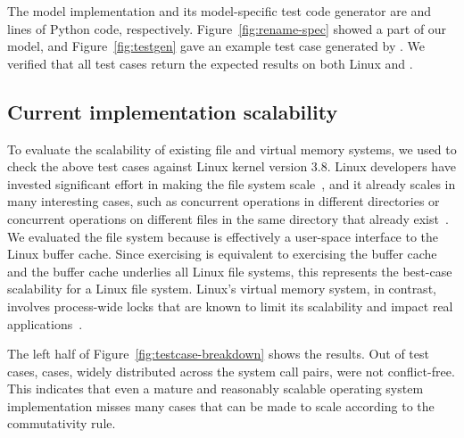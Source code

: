 The model implementation and its model-specific test code generator
are  and
 lines of Python code,
respectively.
Figure~\ref{fig:rename-spec} showed a part of our
model, and Figure~\ref{fig:testgen} gave an example test
case generated by \tool{}.  We verified that all test cases return
the expected results on both Linux and \sys.
\cbend

\begin{figure*}
\small
\centering

\caption{
  Scalability for system call pairs, showing the fraction and number
  of test cases generated by \tool that are not
  conflict-free for each system call pair.
  One example test case was shown in Figure~\ref{fig:testgen}.
}
\label{fig:testcase-breakdown}
\end{figure*}


\subsection{Current implementation scalability}

To evaluate the scalability of existing file and virtual memory systems,
we used \mtrace{} to check the above test cases against
Linux kernel version 3.8.
Linux developers have invested significant effort in making the file
system scale~\cite{boyd-wickizer:scaling}, and it already scales in
many interesting cases, such as concurrent operations in different
directories or concurrent operations on different files in the same
directory that already exist~\cite{lwn:dcache}.
%
\cbstart We evaluated the  file system because
 is effectively a user-space interface to the Linux buffer
cache.  Since exercising  is equivalent to exercising the
buffer cache and the buffer cache underlies all Linux file
systems, this represents the best-case scalability for a Linux file
system.
%
Linux's virtual memory system, in contrast, involves process-wide
locks that are known to limit its
scalability and impact real
applications~\cite{boyd-wickizer:scaling,clements:bonsai,gil:c4}.
\cbend

The left half of Figure~\ref{fig:testcase-breakdown} shows the results.
Out of  test cases,
 cases, widely distributed across the
system call pairs, were not conflict-free.
This indicates that even a mature and reasonably scalable operating system
implementation misses many cases that can be made to scale according
to the commutativity rule.


